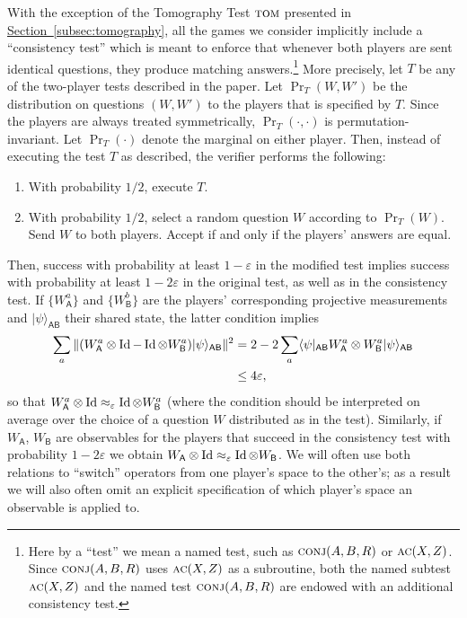\documentclass[11pt]{article}
\numberwithin{equation}{section}
\theoremstyle{definition}
\theoremstyle{plain}
\newcommand{\expref}[2]{\hyperref[#2]{#1~\ref{#2}}}
\newcommand{\ket}[1]{|#1\rangle}
\newcommand{\bra}[1]{\langle#1|}
\newcommand{\Id}{\ensuremath{\mathop{\rm Id}\nolimits}}
\newcommand{\reg}[1]{{\textsf{#1}}}
\newcommand{\eps}{\varepsilon}
\newcommand{\conj}{\textsc{conj}}
\newcommand{\act}{\textsc{ac}}
\newcommand{\tom}{\textsc{tom}}
\begin{document}
With the exception of the Tomography Test $\tom$ presented in \expref{Section}{subsec:tomography}, 
all the games we consider implicitly include a ``consistency test'' which is meant to enforce that whenever both players are sent identical questions, they produce matching answers.\footnote{Here by a ``test'' we mean a named test, such as $\conj(A,B,R)$ or $\act(X,Z)$. Since $\conj(A,B,R)$ uses $\act(X,Z)$ as a subroutine, both the named subtest $\act(X,Z)$ and the named test $\conj(A,B,R)$ are endowed with an additional consistency test.} More precisely, let $T$ be any of the two-player tests described in the paper. Let $\Pr_T(W,W')$ be the distribution on questions $(W,W')$ to the players that is specified by $T$. Since the players are always treated symmetrically, $\Pr_T(\cdot,\cdot)$ is permutation-invariant. Let $\Pr_T(\cdot)$ denote the marginal on either player. Then, instead of executing the test $T$ as described, the verifier performs the following: 
\begin{enumerate}
\item[(i)] With probability $1/2$, execute $T$.
\item[(ii)] With probability $1/2$, select a random question $W$ according to $\Pr_T(W)$. Send $W$ to both players. Accept if and only if the players' answers are equal. 
\end{enumerate}
Then, success with probability at least $1-\eps$ in the modified test implies success with probability at least $1-2\eps$ in the original test, as well as in the consistency test. If $\{W_{\reg{A}}^a\}$ and $\{W_{\reg{B}}^b\}$ are the players' corresponding projective measurements and $\ket{\psi}_{\reg{AB}}$ their shared state, the latter condition implies 
\begin{align}
\sum_a \|(W_{\reg{A}}^a \otimes \Id - \Id \otimes W_{\reg{B}}^a)\ket{\psi}_{\reg{AB}}\|^2 &= 2-2 \sum_a \bra{\psi}_{\reg{AB}} W_{\reg{A}}^a \otimes W_{\reg{B}}^a \ket{\psi}_{\reg{AB}} \notag\\ 
&\leq 4 \eps,\label{eq:consistency}
\end{align}
so that $W_{\reg{A}}^a \otimes \Id \approx_{\eps} \Id \otimes
W_{\reg{B}}^a$ (where the condition should be interpreted on average over the
choice of a question $W$ distributed as in the test). Similarly, if
$W_{\reg{A}}$, $W_{\reg{B}}$ are observables for the players that succeed in the
consistency test with probability $1-2\eps$ we obtain $W_{\reg{A}}\otimes \Id
\approx_{\eps} \Id \otimes W_{\reg{B}}$. We will often use both relations to ``switch'' operators from one player's space to the other's; as a result we will also often omit an explicit specification of which player's space an observable is applied to. 
\end{document}

